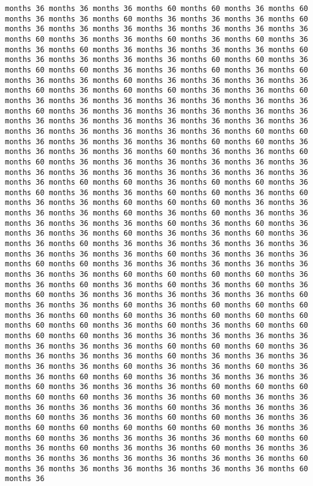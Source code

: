 \documentclass[11pt]{article}
\begin{document}
\begin{Verbatim}[commandchars=\\\{\}, frame=single, framerule=2mm, rulecolor=\color{outerrorbackground}]
months 36 months 36 months 36 months 60 months 60 months 36 months 60 months 36 months 36 months 60 months 36 months 36 months 36 months 60 months 36 months 36 months 36 months 36 months 36 months 36 months 36 months 60 months 36 months 36 months 60 months 36 months 60 months 36 months 36 months 60 months 36 months 36 months 36 months 36 months 60 months 36 months 36 months 36 months 36 months 60 months 60 months 36 months 60 months 60 months 36 months 36 months 60 months 36 months 60 months 36 months 36 months 60 months 36 months 36 months 36 months 36 months 60 months 36 months 60 months 60 months 36 months 36 months 60 months 36 months 36 months 36 months 36 months 36 months 36 months 36 months 60 months 36 months 36 months 36 months 36 months 36 months 36 months 36 months 36 months 36 months 36 months 36 months 36 months 36 months 36 months 36 months 36 months 36 months 36 months 60 months 60 months 36 months 36 months 36 months 36 months 60 months 60 months 36 months 36 months 36 months 36 months 60 months 36 months 36 months 60 months 60 months 36 months 36 months 36 months 36 months 36 months 36 months 36 months 36 months 36 months 36 months 36 months 36 months 36 months 36 months 60 months 60 months 36 months 60 months 60 months 36 months 60 months 36 months 36 months 60 months 60 months 36 months 60 months 36 months 36 months 60 months 60 months 60 months 36 months 36 months 36 months 36 months 60 months 36 months 60 months 36 months 36 months 36 months 36 months 36 months 60 months 36 months 60 months 36 months 36 months 36 months 60 months 36 months 36 months 60 months 36 months 36 months 60 months 36 months 36 months 36 months 36 months 36 months 36 months 36 months 36 months 60 months 36 months 36 months 36 months 60 months 60 months 36 months 36 months 36 months 36 months 36 months 36 months 36 months 60 months 60 months 60 months 60 months 36 months 36 months 60 months 36 months 60 months 36 months 60 months 36 months 60 months 36 months 36 months 36 months 36 months 36 months 60 months 36 months 36 months 60 months 36 months 60 months 60 months 60 months 36 months 60 months 60 months 36 months 60 months 60 months 60 months 60 months 60 months 36 months 60 months 36 months 60 months 60 months 60 months 60 months 36 months 36 months 36 months 36 months 36 months 36 months 36 months 36 months 60 months 60 months 60 months 36 months 36 months 36 months 36 months 60 months 36 months 36 months 36 months 36 months 36 months 60 months 36 months 36 months 60 months 36 months 36 months 60 months 60 months 36 months 36 months 36 months 36 months 60 months 36 months 36 months 36 months 60 months 60 months 60 months 60 months 60 months 36 months 36 months 60 months 36 months 36 months 36 months 36 months 36 months 60 months 36 months 36 months 36 months 60 months 36 months 36 months 60 months 60 months 36 months 36 months 60 months 60 months 60 months 60 months 60 months 36 months 36 months 60 months 36 months 36 months 36 months 36 months 60 months 60 months 36 months 60 months 36 months 36 months 60 months 36 months 36 months 36 months 36 months 36 months 36 months 36 months 36 months 60 months 36 months 36 months 36 months 36 months 36 months 36 months 60 months 36 
\end{Verbatim}
\end{document}
